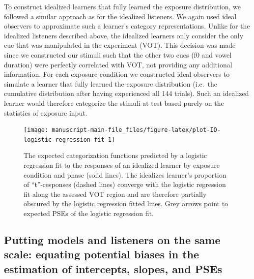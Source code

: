 \documentclass[
  11pt,
  man,mask,floatsintext]{apa6}
\begin{document}
To construct idealized learners that fully learned the exposure distribution, we followed a similar approach as for the idealized listeners. We again used ideal observers to approximate such a learner's category representations. Unlike for the idealized listeners described above, the idealized learners only consider the only cue that was manipulated in the experiment (VOT). This decision was made since we constructed our stimuli such that the other two cues (f0 and vowel duration) were perfectly correlated with VOT, not providing any additional information. For each exposure condition we constructed ideal observers to simulate a learner that fully learned the exposure distribution (i.e.~the cumulative distribution after having experienced all 144 trials). Such an idealized learner would therefore categorize the stimuli at test based purely on the statistics of exposure input.



\begin{figure}

{\centering \texttt{[image: manuscript-main-file\_files/figure-latex/plot-IO-logistic-regression-fit-1]} 

}

\caption{The expected categorization functions predicted by a logistic regression fit to the responses of an idealized learner by exposure condition and phase (solid lines). The idealizes learner's proportion of ``t''-responses (dashed lines) converge with the logistic regression fit along the assessed VOT region and are therefore partially obscured by the logistic regression fitted lines. Grey arrows point to expected PSEs of the logistic regression fit.}\label{fig:plot-IO-logistic-regression-fit}
\end{figure}

\subsection{Putting models and listeners on the same scale: equating potential biases in the estimation of intercepts, slopes, and PSEs}\label{sec:io-bias-correction}
\end{document}
